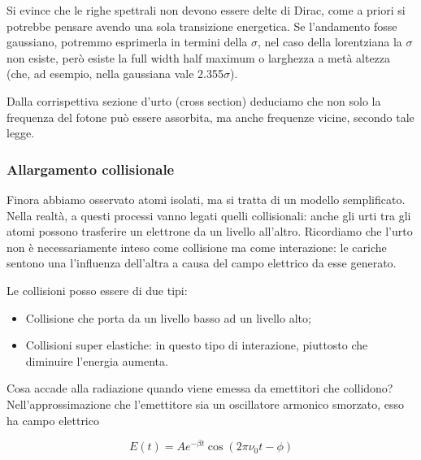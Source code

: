 Si evince che le righe spettrali non devono essere delte di Dirac, come a priori si potrebbe pensare avendo una sola transizione energetica. Se l'andamento fosse gaussiano, potremmo esprimerla in termini della $\sigma$, nel caso della lorentziana la $\sigma$ non esiste, però esiste la full width half maximum o larghezza a metà altezza (che, ad esempio, nella gaussiana vale 2.355$\sigma$).

Dalla corrispettiva sezione d'urto (cross section) deduciamo che non solo la frequenza del fotone può essere assorbita, ma anche frequenze vicine, secondo tale legge.

\subsubsection{Allargamento collisionale}

Finora abbiamo osservato atomi isolati, ma si tratta di un modello semplificato. Nella realtà, a questi processi vanno legati quelli collisionali: anche gli urti tra gli atomi possono trasferire un elettrone da un livello all'altro. Ricordiamo che l'urto non è necessariamente inteso come collisione ma come interazione: le cariche sentono una l'influenza dell'altra a causa del campo elettrico da esse generato.

Le collisioni posso essere di due tipi:

\begin{itemize}
  \item Collisione che porta da un livello basso ad un livello alto;
  \item Collisioni super elastiche: in questo tipo di interazione, piuttosto che diminuire l'energia aumenta.
\end{itemize}


Cosa accade alla radiazione quando viene emessa da emettitori che collidono? Nell'approssimazione che l'emettitore sia un oscillatore armonico smorzato, esso ha campo elettrico

\begin{equation*}
  E(t)=Ae^{-\beta t} \cos{(2\pi \nu_0 t - \phi)}
\end{equation*}

